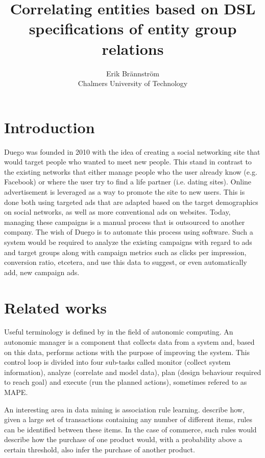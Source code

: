 \documentclass[a4paper]{article}
\begin{document}
\title{Correlating entities based on DSL specifications of entity group relations}
\author{Erik Brännström\\
  Chalmers University of Technology}
\date{}
\maketitle

\section{Introduction}
Duego was founded in 2010 with the idea of creating a social networking site that would target people who wanted to meet new
people. This stand in contrast to the existing networks that either manage people who the user already know (e.g. Facebook)
or where the user try to find a life partner (i.e. dating sites). Online advertisement is leveraged as a way to promote the
site to new users. This is done both using targeted ads that are adapted based on the target demographics on social networks,
as well as more conventional ads on websites. Today, managing these campaigns is a manual process that is outsourced to
another company. The wish of Duego is to automate this process using software. Such a system would be required to analyze
the existing campaigns with regard to ads and target groups along with campaign metrics such as clicks per impression,
conversion ratio, etcetera, and use this data to suggest, or even automatically add, new campaign ads.

\section{Related works}
Useful terminology is defined by \citet{IBM2006} in the field of autonomic computing. An autonomic manager is a component that
collects data from a system and, based on this data, performs actions with the purpose of improving the system. This control
loop is divided into four sub-tasks called monitor (collect system information), analyze (correlate and model data), plan
(design behaviour required to reach goal) and execute (run the planned actions), sometimes refered to as MAPE.

An interesting area in data mining is association rule learning. \citet{Agrawal1993} describe how, given a large set of
transactions containing any number of different items, rules can be identified between these items. In the case of commerce,
such rules would describe how the purchase of one product would, with a probability above a certain threshold, also infer
the purchase of another product.
\end{document}
